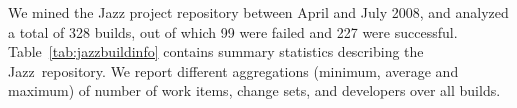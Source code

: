 %
%
%
%

We mined the Jazz project repository between April and July 2008, and analyzed a
total of 328 builds, out of which 99 were failed and 227 were successful.
Table~\ref{tab:jazzbuildinfo} contains summary statistics describing the Jazz\tm\
repository. We report different aggregations (minimum, average and maximum) of
number of work items, change sets, and developers over all builds. 





